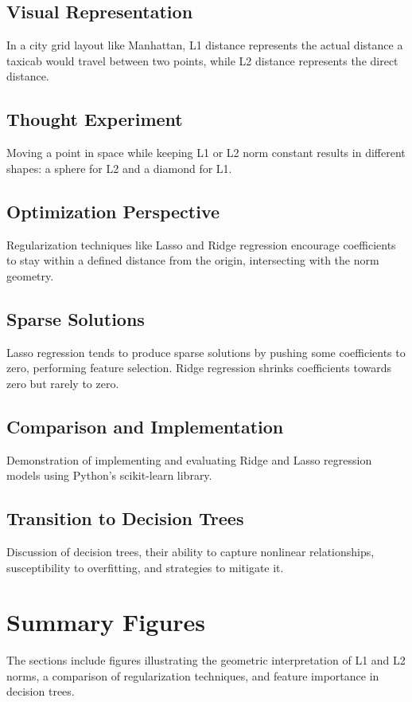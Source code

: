 \documentclass{article}
\begin{document}
\subsection{Visual Representation}
In a city grid layout like Manhattan, L1 distance represents the actual distance a taxicab would travel between two points, while L2 distance represents the direct distance.

\subsection{Thought Experiment}
Moving a point in space while keeping L1 or L2 norm constant results in different shapes: a sphere for L2 and a diamond for L1.

\subsection{Optimization Perspective}
Regularization techniques like Lasso and Ridge regression encourage coefficients to stay within a defined distance from the origin, intersecting with the norm geometry.

\subsection{Sparse Solutions}
Lasso regression tends to produce sparse solutions by pushing some coefficients to zero, performing feature selection. Ridge regression shrinks coefficients towards zero but rarely to zero.

\subsection{Comparison and Implementation}
Demonstration of implementing and evaluating Ridge and Lasso regression models using Python's scikit-learn library.

\subsection{Transition to Decision Trees}
Discussion of decision trees, their ability to capture nonlinear relationships, susceptibility to overfitting, and strategies to mitigate it.

\section{Summary Figures}
The sections include figures illustrating the geometric interpretation of L1 and L2 norms, a comparison of regularization techniques, and feature importance in decision trees.
\end{document}
